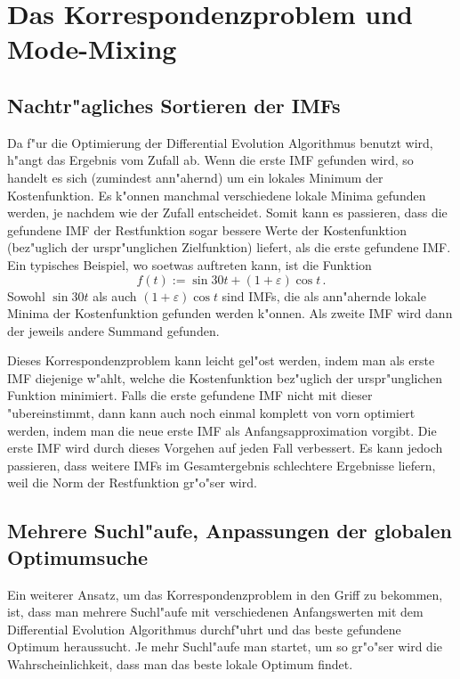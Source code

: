 \documentclass[a4paper]{scrartcl}
\begin{document}
\section{Das Korrespondenzproblem und Mode-Mixing}

\subsection{Nachtr"agliches Sortieren der IMFs}

Da f"ur die Optimierung der Differential Evolution Algorithmus benutzt wird, h"angt das Ergebnis vom Zufall ab. 
Wenn die erste IMF gefunden wird, so handelt es sich (zumindest ann"ahernd) um ein lokales Minimum der Kostenfunktion. 
Es k"onnen manchmal verschiedene lokale Minima gefunden werden, je nachdem wie der Zufall entscheidet. 
Somit kann es passieren, dass die gefundene IMF der Restfunktion sogar bessere Werte der Kostenfunktion (bez"uglich der urspr"unglichen Zielfunktion) liefert, als die erste gefundene IMF. 
Ein typisches Beispiel, wo soetwas auftreten kann, ist die Funktion
$$ f(t) := \sin 30t + (1+\varepsilon)\cos t\,. $$
Sowohl $\sin 30t$ als auch $(1+\varepsilon)\cos t$ sind IMFs, die als ann"ahernde lokale Minima der Kostenfunktion gefunden werden k"onnen. 
Als zweite IMF wird dann der jeweils andere Summand gefunden. 

Dieses Korrespondenzproblem kann leicht gel"ost werden, indem man als erste IMF diejenige w"ahlt, welche die Kostenfunktion bez"uglich der urspr"unglichen Funktion minimiert. 
Falls die erste gefundene IMF nicht mit dieser "ubereinstimmt, dann kann auch noch einmal komplett von vorn optimiert werden, indem man die neue erste IMF als Anfangsapproximation vorgibt. 
Die erste IMF wird durch dieses Vorgehen auf jeden Fall verbessert. 
Es kann jedoch passieren, dass weitere IMFs im Gesamtergebnis schlechtere Ergebnisse liefern, weil die Norm der Restfunktion gr"o"ser wird.


\subsection{Mehrere Suchl"aufe, Anpassungen der globalen Optimumsuche} \label{sec:aormchsogz}

Ein weiterer Ansatz, um das Korrespondenzproblem in den Griff zu bekommen, ist, dass man mehrere Suchl"aufe mit verschiedenen Anfangswerten mit dem Differential Evolution Algorithmus durchf"uhrt und das beste gefundene Optimum heraussucht. 
Je mehr Suchl"aufe man startet, um so gr"o"ser wird die Wahrscheinlichkeit, dass man das beste lokale Optimum findet. 
\end{document}
